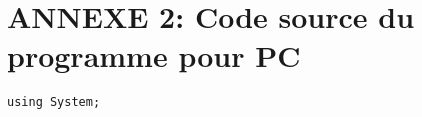 \section{ANNEXE 2: Code source du programme pour PC}
\begin{lstlisting}
using System;

\end{lstlisting}

